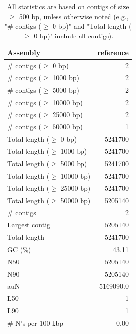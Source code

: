 \documentclass[12pt,a4paper]{article}
\begin{document}
\begin{table}[ht]
\begin{center}
\caption{All statistics are based on contigs of size $\geq$ 500 bp, unless otherwise noted (e.g., "\# contigs ($\geq$ 0 bp)" and "Total length ($\geq$ 0 bp)" include all contigs).}
\begin{tabular}{|l*{1}{|r}|}
\hline
Assembly & reference \\ \hline
\# contigs ($\geq$ 0 bp) & 2 \\ \hline
\# contigs ($\geq$ 1000 bp) & 2 \\ \hline
\# contigs ($\geq$ 5000 bp) & 2 \\ \hline
\# contigs ($\geq$ 10000 bp) & 2 \\ \hline
\# contigs ($\geq$ 25000 bp) & 2 \\ \hline
\# contigs ($\geq$ 50000 bp) & 1 \\ \hline
Total length ($\geq$ 0 bp) & 5241700 \\ \hline
Total length ($\geq$ 1000 bp) & 5241700 \\ \hline
Total length ($\geq$ 5000 bp) & 5241700 \\ \hline
Total length ($\geq$ 10000 bp) & 5241700 \\ \hline
Total length ($\geq$ 25000 bp) & 5241700 \\ \hline
Total length ($\geq$ 50000 bp) & 5205140 \\ \hline
\# contigs & 2 \\ \hline
Largest contig & 5205140 \\ \hline
Total length & 5241700 \\ \hline
GC (\%) & 43.11 \\ \hline
N50 & 5205140 \\ \hline
N90 & 5205140 \\ \hline
auN & 5169090.0 \\ \hline
L50 & 1 \\ \hline
L90 & 1 \\ \hline
\# N's per 100 kbp & 0.00 \\ \hline
\end{tabular}
\end{center}
\end{table}
\end{document}
